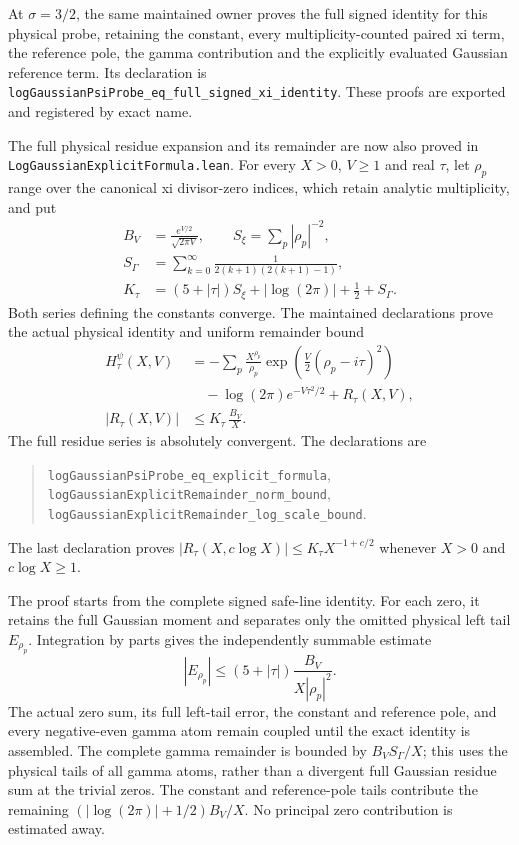 \documentclass[11pt]{article}
\theoremstyle{definition}
\begin{document}
At $\sigma=3/2$, the same maintained owner proves the full signed
identity for this physical probe, retaining the constant,
every multiplicity-counted paired xi term, the reference pole,
the gamma contribution and the explicitly evaluated Gaussian
reference term. Its declaration is
\texttt{logGaussianPsiProbe\_eq\_\allowbreak full\_signed\_xi\_identity}.
These proofs are exported and registered by exact name.

The full physical residue expansion and its remainder are now also
proved in \texttt{LogGaussianExplicitFormula.lean}.
For every $X>0$, $V\ge1$ and real $\tau$, let
$\rho_p$ range over the canonical xi divisor-zero indices, which retain
analytic multiplicity, and put
\[
 \begin{aligned}
 B_V&=\frac{e^{V/2}}{\sqrt{2\pi V}},
       \qquad S_\xi=\sum_p|\rho_p|^{-2},\\
 S_\Gamma&=\sum_{k=0}^\infty
             \frac1{2(k+1)(2(k+1)-1)},\\
 K_\tau&=(5+|\tau|)S_\xi+|\log(2\pi)|+\frac12+S_\Gamma .
 \end{aligned}
\]
Both series defining the constants converge. The maintained declarations
prove the actual physical identity and uniform remainder bound
\[
 \begin{aligned}
 H_\tau^\psi(X,V)
   &=-\sum_p\frac{X^{\rho_p}}{\rho_p}
               \exp\!\left(\frac V2(\rho_p-i\tau)^2\right)\\
   &\quad{}-\log(2\pi)e^{-V\tau^2/2}+R_\tau(X,V),\\
 |R_\tau(X,V)|&\le K_\tau\,\frac{B_V}{X}.
 \end{aligned}
\]
The full residue series is absolutely convergent.
The declarations are
\begin{quote}
\texttt{logGaussian\allowbreak PsiProbe\_eq\_\allowbreak explicit\_formula},\\
\texttt{logGaussian\allowbreak ExplicitRemainder\_\allowbreak norm\_bound},\\
\texttt{logGaussian\allowbreak ExplicitRemainder\_\allowbreak log\_scale\_bound}.
\end{quote}
The last declaration proves
$|R_\tau(X,c\log X)|\le K_\tau X^{-1+c/2}$
whenever $X>0$ and $c\log X\ge1$.

The proof starts from the complete signed safe-line identity.
For each zero, it retains the full Gaussian moment and separates only
the omitted physical left tail $E_{\rho_p}$.
Integration by parts gives the independently summable estimate
\[
 |E_{\rho_p}|
 \le (5+|\tau|)\frac{B_V}{X|\rho_p|^2}.
\]
The actual zero sum, its full left-tail error, the constant and reference
pole, and every negative-even gamma atom remain coupled until the exact
identity is assembled. The complete gamma remainder is bounded by
$B_V S_\Gamma/X$; this uses the physical tails of all gamma atoms,
rather than a divergent full Gaussian residue sum at the trivial zeros.
The constant and reference-pole tails contribute the remaining
$(|\log(2\pi)|+1/2)B_V/X$.
No principal zero contribution is estimated away.
\end{document}
